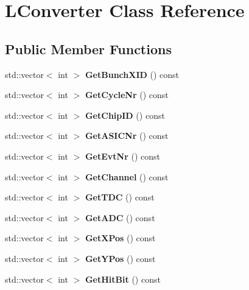 \section{LConverter Class Reference}
\label{classLConverter}
\subsection*{Public Member Functions}
\begin{DoxyCompactItemize}
\item 
std::vector$<$ int $>$ {\bfseries GetBunchXID} () const \label{classLConverter_aa36cabb750e60dab0c27a8868fbf822f}

\item 
std::vector$<$ int $>$ {\bfseries GetCycleNr} () const \label{classLConverter_ade0160100df41b58edb54a6cccf265f2}

\item 
std::vector$<$ int $>$ {\bfseries GetChipID} () const \label{classLConverter_a7e258458a690e3f969078eb0e2b25550}

\item 
std::vector$<$ int $>$ {\bfseries GetASICNr} () const \label{classLConverter_afd5677457e034b1314b16c12cb379a1e}

\item 
std::vector$<$ int $>$ {\bfseries GetEvtNr} () const \label{classLConverter_a75d43fbe9aeb66f852a72ef5b3acdac3}

\item 
std::vector$<$ int $>$ {\bfseries GetChannel} () const \label{classLConverter_a421bc622c868a9acb10cbf371d967619}

\item 
std::vector$<$ int $>$ {\bfseries GetTDC} () const \label{classLConverter_a6b3fb44f0f5dd2aec1abea2b9c6b11a5}

\item 
std::vector$<$ int $>$ {\bfseries GetADC} () const \label{classLConverter_a281711127b23f444867fd96ab112cec7}

\item 
std::vector$<$ int $>$ {\bfseries GetXPos} () const \label{classLConverter_aa984a603c6c7dd60c412818d580d4a1e}

\item 
std::vector$<$ int $>$ {\bfseries GetYPos} () const \label{classLConverter_ab7e4941672713e1e654d964a2983e619}

\item 
std::vector$<$ int $>$ {\bfseries GetHitBit} () const \label{classLConverter_a373903e1cda893fccbc8a0a64581cedf}


\end{DoxyCompactItemize}
